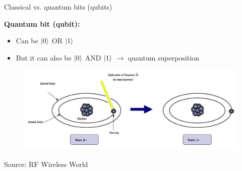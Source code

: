 \documentclass[10pt]{beamer}
\begin{document}
{
\begin{frame}[fragile]{Classical vs. quantum bits (qubits)}

\textbf{Quantum bit (qubit):}
\begin{itemize}
\item Can be $\ket{0}$ OR $\ket{1}$
\item But it can also be $\ket{0}$ AND $\ket{1}$ $\rightarrow$ quantum superposition
\end{itemize}

\begin{figure}
\includegraphics[scale=0.3]{qubitimplementation.jpeg}
\end{figure}
\tiny{Source: RF Wireless World}

\end{frame}
}
\end{document}
